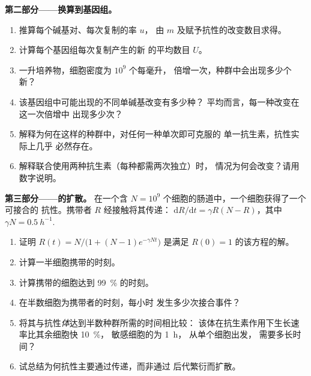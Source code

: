 \begin{problem}
\medskip
\noindent\textbf{第二部分——换算到基因组。}
\begin{enumerate}[resume]
  \item 推算每个碱基对、每次复制的率 $u$，
        由 $m$ 及赋予抗性的改变数目求得。
  \item 计算每个基因组每次复制产生的新
        的平均数目 $U$。
  \item 一升培养物，细胞密度为 $10^{9}$ 个每毫升，
        倍增一次，种群中会出现多少个新？
  \item 该基因组中可能出现的不同单碱基改变有多少种？
        平均而言，每一种改变在这一次倍增中
        出现多少次？
  \item 解释为何在这样的种群中，对任何一种单次即可克服的
        单一抗生素，抗性实际上几乎
        必然存在。
  \item 解释联合使用两种抗生素（每种都需两次独立）时，
        情况为何会改变？请用数字说明。
\end{enumerate}

\medskip
\noindent\textbf{第三部分——的扩散。}
在一个含 $N = 10^{9}$ 个细胞的肠道中，一个细胞获得了一个可接合的
抗性。携带者 $R$ 经接触将其传递：
$\mathrm{d}R/\mathrm{d}t = \gamma R(N - R)$，其中 $\gamma N =
\qty{0.5}{h^{-1}}$.
\begin{enumerate}[resume]
  \item 证明 $R(t) = N/\bigl(1 + (N - 1)e^{-\gamma N t}\bigr)$
        是满足 $R(0) = 1$ 的该方程的解。
  \item 计算一半细胞携带的时刻。
  \item 计算携带的细胞达到 \qty{99}{\%} 的时刻。
  \item 在半数细胞为携带者的时刻，每小时
        发生多少次接合事件？
  \item 将其与抗性\emph{体}达到半数种群所需的时间相比较：
        该体在抗生素作用下生长速率比其余细胞快 \qty{10}{\%}，
        敏感细胞的为 \qty{1}{h}，
        从单个细胞出发，
        需要多长时间？
  \item 试总结为何抗性主要通过传递，而非通过
        后代繁衍而扩散。
\end{enumerate}


\end{problem}
